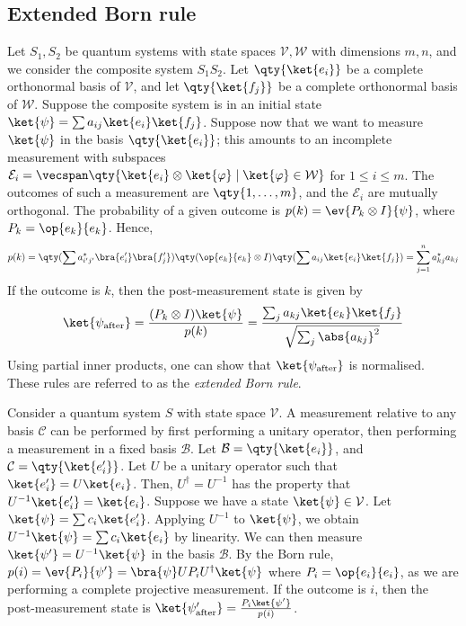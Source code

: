 \subsection{Extended Born rule}
Let \( S_1, S_2 \) be quantum systems with state spaces \( \mathcal V, \mathcal W \) with dimensions \( m, n \), and we consider the composite system \( S_1 S_2 \).
Let \( \qty{\ket{e_i}} \) be a complete orthonormal basis of \( \mathcal V \), and let \( \qty{\ket{f_j}} \) be a complete orthonormal basis of \( \mathcal W \).
Suppose the composite system is in an initial state \( \ket{\psi} = \sum a_{ij} \ket{e_i} \ket{f_j} \).
Suppose now that we want to measure \( \ket{\psi} \) in the basis \( \qty{\ket{e_i}} \); this amounts to an incomplete measurement with subspaces \( \mathcal E_i = \vecspan \qty{\ket{e_i} \otimes \ket{\varphi} \mid \ket{\varphi} \in \mathcal W} \) for \( 1 \leq i \leq m \).
The outcomes of such a measurement are \( \qty{1, \dots, m} \), and the \( \mathcal E_i \) are mutually orthogonal.
The probability of a given outcome is \( p(k) = \ev{P_k \otimes I}{\psi} \), where \( P_k = \op{e_k}{e_k} \).
Hence,
\[ p(k) = \qty(\sum a_{i'j'}^\star \bra{e_i'} \bra{f_j'}) \qty(\op{e_k}{e_k} \otimes I) \qty(\sum a_{ij} \ket{e_i} \ket{f_j}) = \sum_{j=1}^n a_{kj}^\star a_{kj} \]
If the outcome is \( k \), then the post-measurement state is given by
\[ \ket{\psi_{\text{after}}} = \frac{(P_k \otimes I)\ket{\psi}}{p(k)} = \frac{\sum_j a_{kj} \ket{e_k} \ket{f_j}}{\sqrt{\sum_j \abs{a_{kj}}^2}} \]
Using partial inner products, one can show that \( \ket{\psi_{\text{after}}} \) is normalised.
These rules are referred to as the \emph{extended Born rule}.

Consider a quantum system \( S \) with state space \( \mathcal V \).
A measurement relative to any basis \( \mathcal C \) can be performed by first performing a unitary operator, then performing a measurement in a fixed basis \( \mathcal B \).
Let \( \mathcal B = \qty{\ket{e_i}} \), and \( \mathcal C = \qty{\ket{e_i'}} \).
Let \( U \) be a unitary operator such that \( \ket{e_i'} = U \ket{e_i} \).
Then, \( U^\dagger = U^{-1} \) has the property that \( U^{-1} \ket{e_i'} = \ket{e_i} \).
Suppose we have a state \( \ket{\psi} \in \mathcal V \).
Let \( \ket{\psi} = \sum c_i \ket{e_i'} \).
Applying \( U^{-1} \) to \( \ket{\psi} \), we obtain \( U^{-1} \ket{\psi} = \sum c_i \ket{e_i} \) by linearity.
We can then measure \( \ket{\psi'} = U^{-1} \ket{\psi} \) in the basis \( \mathcal B \).
By the Born rule, \( p(i) = \ev{P_i}{\psi'} = \bra{\psi} U P_i U^\dagger \ket{\psi} \) where \( P_i = \op{e_i}{e_i} \), as we are performing a complete projective measurement.
If the outcome is \( i \), then the post-measurement state is \( \ket{\psi'_{\text{after}}} = \frac{P_i \ket{\psi'}}{p(i)} \).

